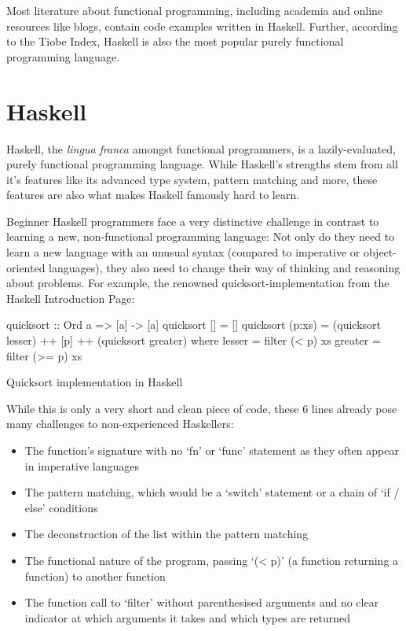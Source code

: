 Most literature about functional programming,
including academia and online resources like blogs, contain code examples written in Haskell.
Further, according to the Tiobe Index\autocite{tiobe-index}, Haskell is also the most popular
purely functional programming language\autocite{comparison-functional-languages}.

\section{Haskell}

Haskell, the \textit{lingua franca} amongst functional programmers, is a lazily-evaluated, purely functional programming
language. While Haskell's strengths stem from all it's features like its advanced type system, pattern matching and more,
these features are also what makes Haskell famously hard to learn\autocite{haskell-hard-one}\autocite{haskell-hard-two}\autocite{haskell-hard-three}\autocite{haskell-hard-four}.

Beginner Haskell programmers face a very distinctive challenge in contrast to learning a new, non-functional programming language:
Not only do they need to learn a new language with an unusual syntax (compared to imperative or object-oriented languages), they
also need to change their way of thinking and reasoning about problems.
For example, the renowned quicksort-implementation from the Haskell Introduction Page\autocite{haskell-quicksort}:

\begin{listing}
\begin{haskellcode}
quicksort :: Ord a => [a] -> [a]
quicksort []     = []
quicksort (p:xs) = (quicksort lesser) ++ [p] ++ (quicksort greater)
    where
        lesser  = filter (< p) xs
        greater = filter (>= p) xs
\end{haskellcode}
	\caption{Quicksort implementation in Haskell}\label{code:haskell-quicksort}
\end{listing}

While this is only a very short and clean piece of code, these 6 lines already pose many challenges to non-experienced Haskellers:

\begin{itemize}
    \item The function's signature with no `fn' or `func' statement as they often appear in imperative languages
    \item The pattern matching, which would be a `switch' statement or a chain of `if / else' conditions
    \item The deconstruction of the list within the pattern matching
    \item The functional nature of the program, passing `(< p)' (a function returning a function) to another function
    \item The function call to `filter' without parenthesised arguments and no clear indicator at which arguments
        it takes and which types are returned
\end{itemize}

